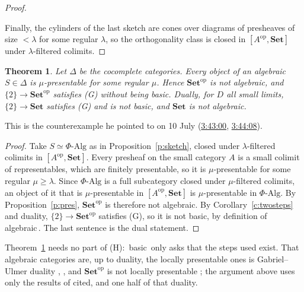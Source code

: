 \documentclass[11pt,a4paper]{amsart}
\newtheorem{theorem}{Theorem}[section]
\theoremstyle{definition}
\theoremstyle{remark}
\newcommand{\q}[1]{\guillemotleft\,#1\,\guillemotright}
\newcommand{\ts}[3]{\href{https://www.youtube.com/watch?v=#1&t=#2}{#3}}
\newcommand{\Set}{\mathbf{Set}}
\begin{document}
\begin{proof}
\begin{itemize}
\end{itemize}
Finally, the cylinders of the last sketch are cones over diagrams of presheaves of size $<\lambda$ for some regular $\lambda$, so the orthogonality class is closed in $[A^{\mathrm{op}},\Set]$ under $\lambda$-filtered colimits.
\end{proof}

\begin{theorem}\label{t:notalg}
Let $\Delta$ be the cocomplete categories. Every object of an algebraic $S\in\Delta$ is $\mu$-presentable for some regular $\mu$. Hence $\Set^{\mathrm{op}}$ is not algebraic, and $\{2\}\to\Set^{\mathrm{op}}$ satisfies (G) without being basic. Dually, for $D$ all small limits, $\{2\}\to\Set$ satisfies (G) and is not basic, and $\Set$ is not algebraic.
\end{theorem}

This is the counterexample he pointed to on 10 July (\ts{4gynb9uTEE4}{3h43m0s}{3:43:00}, \ts{4gynb9uTEE4}{3h44m8s}{3:44:08}).

\begin{proof}
Take $S\simeq\Phi\text{-}\mathrm{Alg}$ as in Proposition~\ref{p:sketch}, closed under $\lambda$-filtered colimits in $[A^{\mathrm{op}},\Set]$. Every presheaf on the small category $A$ is a small colimit of representables, which are finitely presentable, so it is $\mu$-presentable for some regular $\mu\ge\lambda$. Since $\Phi\text{-}\mathrm{Alg}$ is a full subcategory closed under $\mu$-filtered colimits, an object of it that is $\mu$-presentable in $[A^{\mathrm{op}},\Set]$ is $\mu$-presentable in $\Phi\text{-}\mathrm{Alg}$. By Proposition~\ref{p:pres}, $\Set^{\mathrm{op}}$ is therefore not algebraic. By Corollary~\ref{c:twosteps} and duality, $\{2\}\to\Set^{\mathrm{op}}$ satisfies (G), so it is not basic, by definition of \q{algebraic}. The last sentence is the dual statement.
\end{proof}

Theorem~\ref{t:notalg} needs no part of (H): \q{basic} only asks that the steps used exist. That algebraic categories are, up to duality, the locally presentable ones is Gabriel--Ulmer duality \cite{gu}, \cite[ch.~1]{ar}, and $\Set^{\mathrm{op}}$ is not locally presentable \cite{gu}; the argument above uses only the results of \cite{kellybook} cited, and one half of that duality.
\end{document}
